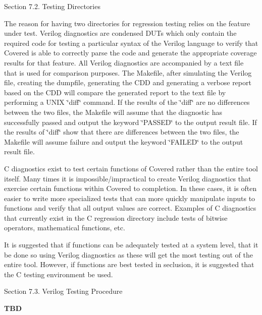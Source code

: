 \begin{Desc}
\item[Section 7.2.  Testing Directories]\par
 The reason for having two directories for regression testing relies on the feature under test. Verilog diagnostics are condensed DUTs which only contain the required code for testing a particular syntax of the Verilog language to verify that Covered is able to correctly parse the code and generate the appropriate coverage results for that feature. All Verilog diagnostics are accompanied by a text file that is used for comparison purposes. The Makefile, after simulating the Verilog file, creating the dumpfile, generating the CDD and generating a verbose report based on the CDD will compare the generated report to the text file by performing a UNIX \char`\"{}diff\char`\"{} command. If the results of the \char`\"{}diff\char`\"{} are no differences between the two files, the Makefile will assume that the diagnostic has successfully passed and output the keyword \char`\"{}PASSED\char`\"{} to the output result file. If the results of \char`\"{}diff\char`\"{} show that there are differences between the two files, the Makefile will assume failure and output the keyword \char`\"{}FAILED\char`\"{} to the output result file.

 C diagnostics exist to test certain functions of Covered rather than the entire tool itself. Many times it is impossible/impractical to create Verilog diagnostics that exercise certain functions within Covered to completion. In these cases, it is often easier to write more specialized tests that can more quickly manipulate inputs to functions and verify that all output values are correct. Examples of C diagnostics that currently exist in the C  regression directory include tests of bitwise operators, mathematical functions, etc.

 It is suggested that if functions can be adequately tested at a system level, that it be done so using Verilog diagnostics as these will get the most testing out of the entire tool. However, if functions are best tested in seclusion, it is suggested that the C testing environment be used.\end{Desc}


\begin{Desc}
\item[Section 7.3.  Verilog Testing Procedure]\par
 {\bf TBD}\end{Desc}


